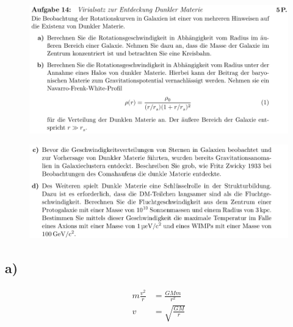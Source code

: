     \begin{figure}[H]
        \centering
        \includegraphics[width=\textwidth]{images/Aufgabe14ab.jpg}
        \label{fig:2}
    \end{figure}

    \begin{figure}[H]
        \centering
        \includegraphics[width=\textwidth]{images/Aufgabe14cd.jpg}
        \label{fig:3}
    \end{figure}

\subsection{a)}
\begin{align}
    m \frac{v^2}{r} &= \frac{GMm}{r^2}\\
    v &= \sqrt{\frac{GM}{r}}
\end{align}

